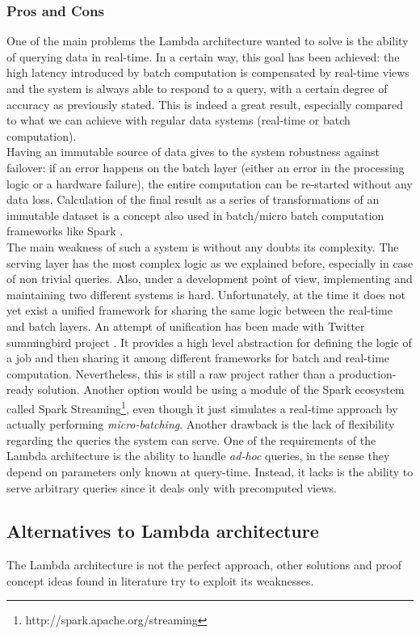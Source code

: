 \subsubsection{Pros and Cons}
One of the main problems the Lambda architecture wanted to solve is the ability of querying data in real-time. In a certain way, this goal has been achieved: the high latency introduced by batch computation is compensated by real-time views and the system is always able to respond to a query, with a certain degree of accuracy as previously stated. This is indeed a great result, especially compared to what we can achieve with regular data systems (real-time or batch computation).\\
Having an immutable source of data gives to the system robustness against failover: if an error happens on the batch layer (either an error in the processing logic or a hardware failure), the entire computation can be re-started without any data loss. Calculation of the final result as a series of transformations of an immutable dataset is a concept also used in batch/micro batch computation frameworks like Spark \cite{bib8}.\\
The main weakness of such a system is without any doubts its complexity. The serving layer has the most complex logic as we explained before, especially in case of non trivial queries. Also, under a development point of view, implementing and maintaining two different systems is hard. Unfortunately, at the time it does not yet exist a unified framework for sharing the same logic between the real-time and batch layers. An attempt of unification has been made with Twitter summingbird project \cite{bib7}. It provides a high level abstraction for defining the logic of a job and then sharing it among different frameworks for batch and real-time computation. Nevertheless, this is still a raw project rather than a production-ready solution. Another option would be using a module of the Spark ecosystem called Spark Streaming\footnote{http://spark.apache.org/streaming}, even though it just simulates a real-time approach by actually performing \textit{micro-batching}.
Another drawback is the lack of flexibility regarding the queries the system can serve. One of the requirements of the Lambda architecture is the ability to handle \textit{ad-hoc} queries, in the sense they depend on parameters only known at query-time. Instead, it lacks is the ability to serve arbitrary queries since it deals only with precomputed views.

\subsection{Alternatives to Lambda architecture}
The Lambda architecture is not the perfect approach, other solutions and proof concept ideas found in literature try to exploit its weaknesses.

